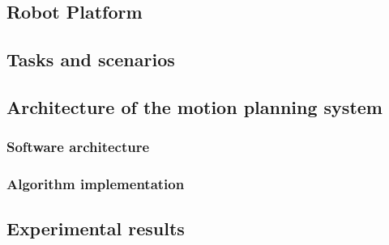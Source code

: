 
\subsection{Robot Platform}


\subsection{Tasks and scenarios}


\subsection{Architecture of the motion planning system}


\subsubsection{Software architecture}



\subsubsection{Algorithm implementation}


\subsection{Experimental results}


